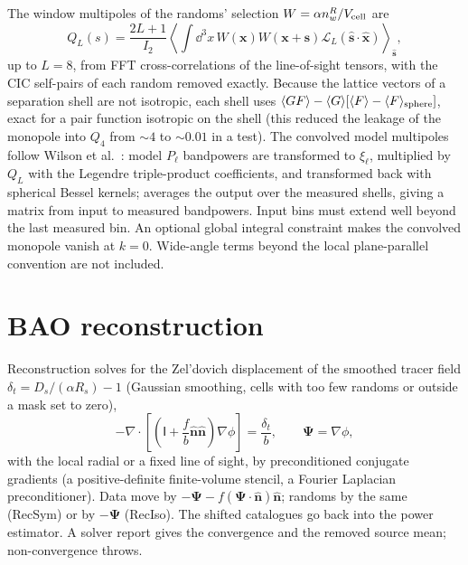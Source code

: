 The window multipoles of the randoms' selection $W=\alpha n_w^R/V_{\rm cell}$ are
\begin{equation}
Q_L(s)=\frac{2L+1}{I_2}\left\langle\int\dd^3x\,W(\bm x)W(\bm x+\bm s)\mathcal L_L(\hat{\bm s}\cdot\hat{\bm x})\right\rangle_{\hat{\bm s}},
\end{equation}
up to $L=8$, from FFT cross-correlations of the line-of-sight tensors, with the CIC self-pairs of each random removed exactly. Because the lattice vectors
of a separation shell are not isotropic, each shell uses $\langle GF\rangle-\langle G\rangle[\langle F\rangle-\langle F\rangle_{\rm sphere}]$, exact for a pair
function isotropic on the shell (this reduced the leakage of the monopole into $Q_4$ from $\sim4$ to $\sim0.01$ in a test). The convolved model multipoles
follow Wilson et al.\ \cite{Wilson2017}: model $P_\ell$ bandpowers are transformed to $\xi_\ell$, multiplied by $Q_L$ with the Legendre triple-product
coefficients, and transformed back with spherical Bessel kernels;  averages the output over the measured shells, giving a
matrix from input to measured bandpowers. Input bins must extend well beyond the last measured bin. An optional global integral constraint makes the
convolved monopole vanish at $k=0$. Wide-angle terms beyond the local plane-parallel convention are not included.

\section{BAO reconstruction}\label{sec:survey-reconstruction}

Reconstruction \cite{Eisenstein2007,Padmanabhan2012} solves for the Zel'dovich displacement of the smoothed tracer field
$\delta_t=D_s/(\alpha R_s)-1$ (Gaussian smoothing, cells with too few randoms or outside a mask set to zero),
\begin{equation}
-\nabla\cdot\left[\left(\mathsf I+\frac fb\hat{\bm n}\hat{\bm n}\right)\nabla\phi\right]=\frac{\delta_t}{b},\qquad\bm\Psi=\nabla\phi,
\end{equation}
with the local radial or a fixed line of sight, by preconditioned conjugate gradients (a positive-definite finite-volume stencil, a Fourier Laplacian
preconditioner). Data move by $-\bm\Psi-f(\bm\Psi\cdot\hat{\bm n})\hat{\bm n}$; randoms by the same (RecSym) or by $-\bm\Psi$ (RecIso). The shifted
catalogues go back into the power estimator. A solver report gives the convergence and the removed source mean; non-convergence throws.

